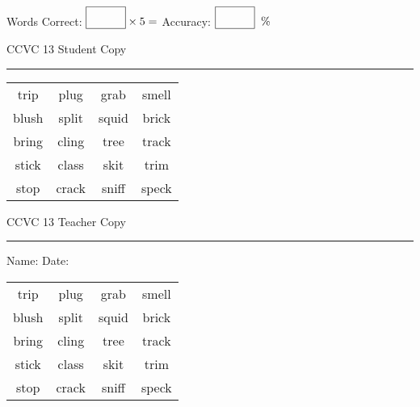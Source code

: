 \documentclass{memoir}
\begin{document}
\normalsize

Words Correct: $\fbox{\phantom{\huge 100}} \times 5 = $ Accuracy: $\fbox{\phantom{\huge 100}}\;\; \%$ 

\vfill

\newpage


\footnotesize \noindent
CCVC 13 \hfill Student Copy
\smallskip
\hrule

\Large

\setlength{\tabcolsep}{14pt}
\def\arraystretch{3}

{\selectfont


\begin{vplace}[0.5]
\begin{center}
\begin{tabular}{cccc}
trip & plug & grab                    & smell \\
blush & split & squid & brick       \\
bring      & cling & tree & track       \\
stick & class             & skit & trim \\
stop & crack       & sniff & speck \\
\end{tabular}
\end{center}
\end{vplace}

}

\newpage

\footnotesize \noindent
CCVC 13 \hfill Teacher Copy
\smallskip
\hrule

\normalsize

\vfill

\noindent
Name: \underline{\hspace{1.75in}} \hfill Date: \underline{\hspace{1in}}

\Large

{\selectfont


\begin{vplace}[0.5]
\begin{center}
\begin{tabular}{cccc}
trip & plug & grab                    & smell \\
blush & split & squid & brick       \\
bring      & cling & tree & track       \\
stick & class             & skit & trim \\
stop & crack       & sniff & speck \\
\end{tabular}
\end{center}
\end{vplace}



}
\end{document}
